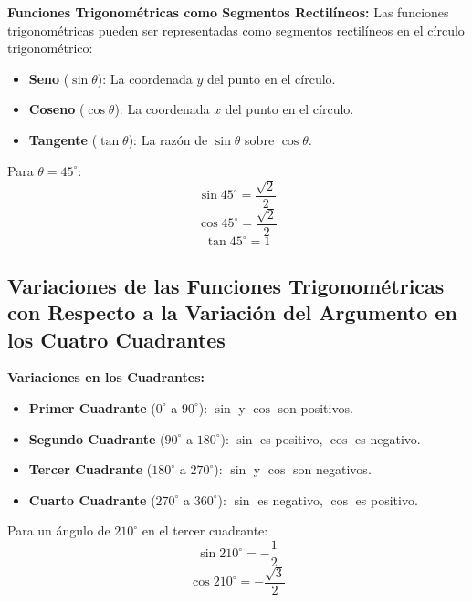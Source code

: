 \begin{definition}
    \textbf{Funciones Trigonométricas como Segmentos Rectilíneos:} Las funciones trigonométricas pueden ser representadas como segmentos rectilíneos en el círculo trigonométrico:
    \begin{itemize}
        \item \textbf{Seno} (\(\sin\theta\)): La coordenada \(y\) del punto en el círculo.
        \item \textbf{Coseno} (\(\cos\theta\)): La coordenada \(x\) del punto en el círculo.
        \item \textbf{Tangente} (\(\tan\theta\)): La razón de \(\sin\theta\) sobre \(\cos\theta\).
    \end{itemize}
\end{definition}

\begin{example}
    Para \(\theta = 45^\circ\):
    \[
    \sin 45^\circ = \frac{\sqrt{2}}{2}
    \]
    \[
    \cos 45^\circ = \frac{\sqrt{2}}{2}
    \]
    \[
    \tan 45^\circ = 1
    \]
\end{example}

\subsection{Variaciones de las Funciones Trigonométricas con Respecto a la Variación del Argumento en los Cuatro Cuadrantes}

\begin{definition}
    \textbf{Variaciones en los Cuadrantes:}
    \begin{itemize}
        \item \textbf{Primer Cuadrante} (\(0^\circ\) a \(90^\circ\)): \(\sin\) y \(\cos\) son positivos.
        \item \textbf{Segundo Cuadrante} (\(90^\circ\) a \(180^\circ\)): \(\sin\) es positivo, \(\cos\) es negativo.
        \item \textbf{Tercer Cuadrante} (\(180^\circ\) a \(270^\circ\)): \(\sin\) y \(\cos\) son negativos.
        \item \textbf{Cuarto Cuadrante} (\(270^\circ\) a \(360^\circ\)): \(\sin\) es negativo, \(\cos\) es positivo.
    \end{itemize}
\end{definition}

\begin{example}
    Para un ángulo de \(210^\circ\) en el tercer cuadrante:
    \[
    \sin 210^\circ = -\frac{1}{2}
    \]
    \[
    \cos 210^\circ = -\frac{\sqrt{3}}{2}
    \]
\end{example}

